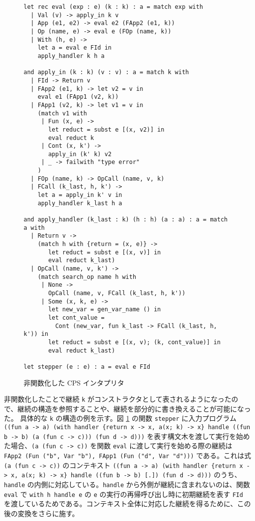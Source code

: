 \begin{figure}
\begin{verbatim}
let rec eval (exp : e) (k : k) : a = match exp with
  | Val (v) -> apply_in k v
  | App (e1, e2) -> eval e2 (FApp2 (e1, k))
  | Op (name, e) -> eval e (FOp (name, k))
  | With (h, e) ->
    let a = eval e FId in
    apply_handler k h a

and apply_in (k : k) (v : v) : a = match k with
  | FId -> Return v
  | FApp2 (e1, k) -> let v2 = v in
    eval e1 (FApp1 (v2, k))
  | FApp1 (v2, k) -> let v1 = v in
    (match v1 with
     | Fun (x, e) ->
       let reduct = subst e [(x, v2)] in
       eval reduct k
     | Cont (x, k') ->
       apply_in (k' k) v2
     | _ -> failwith "type error"
    )
  | FOp (name, k) -> OpCall (name, v, k)
  | FCall (k_last, h, k') ->
    let a = apply_in k' v in
    apply_handler k_last h a

and apply_handler (k_last : k) (h : h) (a : a) : a = match a with
  | Return v ->
    (match h with {return = (x, e)} ->
       let reduct = subst e [(x, v)] in
       eval reduct k_last)
  | OpCall (name, v, k') ->
    (match search_op name h with
     | None ->
       OpCall (name, v, FCall (k_last, h, k'))
     | Some (x, k, e) ->
       let new_var = gen_var_name () in
       let cont_value =
         Cont (new_var, fun k_last -> FCall (k_last, h, k')) in
       let reduct = subst e [(x, v); (k, cont_value)] in
       eval reduct k_last)

let stepper (e : e) : a = eval e FId
\end{verbatim}
\caption{非関数化した CPS インタプリタ}
\label{figure:2defun}
\end{figure}

非関数化したことで継続 \texttt{k} がコンストラクタとして表されるようになったので、継続の構造を参照することや、継続を部分的に書き換えることが可能になった。
具体的な \texttt{k} の構造の例を示す。図 \ref{figure:2defun} の関数 \texttt{stepper} に入力プログラム \texttt{((fun a -> a) (with handler \{return x -> x, a(x; k) -> x\} handle ((fun b -> b) (a (fun c -> c))) (fun d -> d)))} を表す構文木を渡して実行を始めた場合、\texttt{(a (fun c -> c))} を関数 \texttt{eval} に渡して実行を始める際の継続は \texttt{FApp2 (Fun ("b", Var "b"), FApp1 (Fun ("d", Var "d")))} である。これは式 \texttt{(a (fun c -> c))} のコンテキスト \texttt{((fun a -> a) (with handler \{return x -> x, a(x; k) -> x\} handle ((fun b -> b) [.]) (fun d -> d)))} のうち、\texttt{handle} の内側に対応している。\texttt{handle} から外側が継続に含まれないのは、関数 \texttt{eval} で \texttt{with h handle e} の \texttt{e} の実行の再帰呼び出し時に初期継続を表す \texttt{FId} を渡しているためである。コンテキスト全体に対応した継続を得るために、この後の変換をさらに施す。

